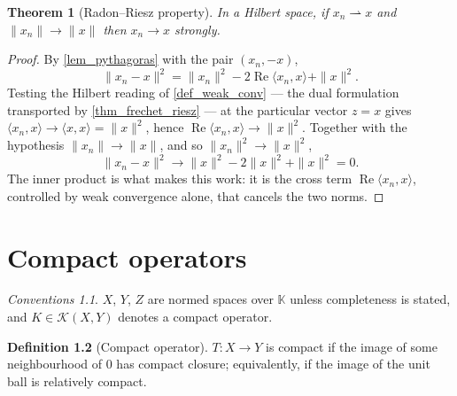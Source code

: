 \documentclass[a4paper]{report}
\theoremstyle{plain}
\newtheorem{theorem}{Theorem}[chapter]
\theoremstyle{definition}
\newtheorem{definition}[theorem]{Definition}
\theoremstyle{remark}
\newtheorem{assumptions}[theorem]{Conventions}
\begin{document}
\begin{theorem}[Radon--Riesz property]
   \label{thm_radon_riesz}
  In a \emph{Hilbert} space, if $x_n \rightharpoonup x$ and $\|x_n\| \to \|x\|$ then
  $x_n \to x$ strongly.
\end{theorem}
\begin{proof}
  By \cref{lem_pythagoras} with the pair $(x_n, -x)$,
  \[
    \|x_n - x\|^2 = \|x_n\|^2 - 2\operatorname{Re}\langle x_n, x\rangle + \|x\|^2 .
  \]
  Testing the Hilbert reading of \cref{def_weak_conv} --- the dual formulation transported
  by \cref{thm_frechet_riesz} --- at the particular vector $z = x$ gives
  $\langle x_n, x\rangle \to \langle x,x\rangle = \|x\|^2$, hence
  $\operatorname{Re}\langle x_n,x\rangle \to \|x\|^2$.  Together with the hypothesis
  $\|x_n\| \to \|x\|$, and so $\|x_n\|^2 \to \|x\|^2$,
  \[
    \|x_n-x\|^2 \longrightarrow \|x\|^2 - 2\|x\|^2 + \|x\|^2 = 0 .
  \]
  The inner product is what makes this work: it is the cross term
  $\operatorname{Re}\langle x_n,x\rangle$, controlled by weak convergence alone, that
  cancels the two norms.
\end{proof}



\chapter{Compact operators}
\label{ch_06_compact_operators}

\begin{assumptions}
  \label{asm_compact_operators}
  $X$, $Y$, $Z$ are normed spaces over $\mathbb{K}$
unless completeness is stated, and $K \in \mathcal{K}(X,Y)$ denotes a compact operator.

\end{assumptions}

\begin{definition}[Compact operator]
  \label{def_compact_op}
  $T \colon X \to Y$ is compact if the image of some neighbourhood of $0$ has compact
  closure; equivalently, if the image of the unit ball is relatively compact.
\end{definition}
\end{document}
